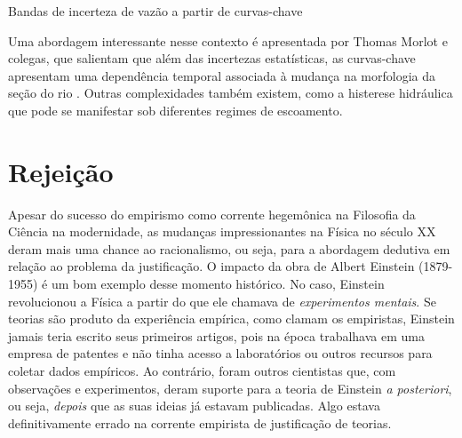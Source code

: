 \documentclass[./main.tex]{subfiles}
\begin{document}
\begin{simplebox}[
    label={destaque_curvas_chave},
    nameref={Curvas-chave}
    ]{Bandas de incerteza de vazão a partir de curvas-chave}
\begin{minipage}[t]{\linewidth}
    \par Uma abordagem interessante nesse contexto é apresentada por Thomas Morlot e colegas, que salientam que além das incertezas estatísticas, as curvas-chave apresentam uma dependência temporal associada à mudança na morfologia da seção do rio \cite{Morlot2014}. Outras complexidades também existem, como a histerese hidráulica que pode se manifestar sob diferentes regimes de escoamento.    
    \end{minipage}
\label{box:rating-curve}
\end{simplebox}

\section{Rejeição} \label{episteme:popper}

\par Apesar do sucesso do empirismo como corrente hegemônica na Filosofia da Ciência na modernidade, as mudanças impressionantes na Física no século XX deram mais uma chance ao racionalismo, ou seja, para a abordagem dedutiva em relação ao problema da justificação. O impacto da obra de Albert Einstein (1879-1955) é um bom exemplo desse momento histórico. No caso, Einstein revolucionou a Física a partir do que ele chamava de \textit{experimentos mentais}. Se teorias são produto da experiência empírica, como clamam os empiristas, Einstein jamais teria escrito seus primeiros artigos, pois na época trabalhava em uma empresa de patentes e não tinha acesso a laboratórios ou outros recursos para coletar dados empíricos. Ao contrário, foram outros cientistas que, com observações e experimentos, deram suporte para a teoria de Einstein \textit{a posteriori}, ou seja, \textit{depois} que as suas ideias já estavam publicadas. Algo estava definitivamente errado na corrente empirista de justificação de teorias.
\end{document}
